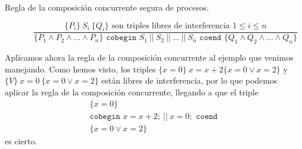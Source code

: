 \begin{description}
    \item [Regla de la composición concurrente segura de procesos.] 
        \begin{equation*}
            \dfrac{\{P_i\}\ S_i\ \{Q_i\} \text{\ son\ triples\ libres\ de\ interferencia\ } 1\leq i \leq n}{\{P_1 \land P_2 \land \ldots \land P_n\} \texttt{\ cobegin\ } S_1\ ||\ S_2\ ||\ \ldots\ ||\ S_n \texttt{\ coend\ } \{Q_1 \land Q_2 \land \ldots \land Q_n\}}
        \end{equation*}
\end{description}

\begin{ejemplo}
    Aplicamos ahora la regla de la composición concurrente al ejemplo que venimos manejando. Como hemos visto, los triples $\{x=0\}\ x=x+2\{x=0 \lor x=2\}$ y $\{V\}\ x=0\ \{x=0 \lor x=2\}$ están libres de interferencia, por lo que podemos aplicar la regla de la composición concurrente, llegando a que el triple
    \begin{gather*}
        \{x=0\} \\
        \texttt{cobegin\ } x=x+2;\ ||\ x=0; \texttt{\ coend} \\
        \{x=0 \lor x=2\}
    \end{gather*}
    es cierto.
\end{ejemplo}

